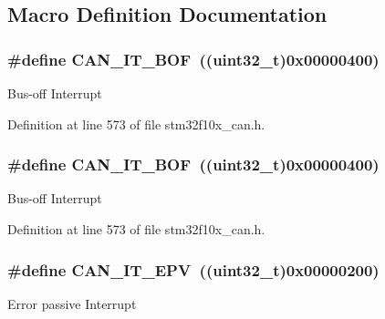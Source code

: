 \subsection{Macro Definition Documentation}
\subsubsection[{\texorpdfstring{C\+A\+N\+\_\+\+I\+T\+\_\+\+B\+OF}{CAN_IT_BOF}}]{\setlength{\rightskip}{0pt plus 5cm}\#define C\+A\+N\+\_\+\+I\+T\+\_\+\+B\+OF~(({\bf uint32\+\_\+t})0x00000400)}\hypertarget{group___c_a_n__interrupts_gad63c39e6237aa07681a1f8ce2ff9e167}{}\label{group___c_a_n__interrupts_gad63c39e6237aa07681a1f8ce2ff9e167}
Bus-\/off Interrupt 

Definition at line 573 of file stm32f10x\+\_\+can.\+h.

\subsubsection[{\texorpdfstring{C\+A\+N\+\_\+\+I\+T\+\_\+\+B\+OF}{CAN_IT_BOF}}]{\setlength{\rightskip}{0pt plus 5cm}\#define C\+A\+N\+\_\+\+I\+T\+\_\+\+B\+OF~(({\bf uint32\+\_\+t})0x00000400)}\hypertarget{group___c_a_n__interrupts_gad63c39e6237aa07681a1f8ce2ff9e167}{}\label{group___c_a_n__interrupts_gad63c39e6237aa07681a1f8ce2ff9e167}
Bus-\/off Interrupt 

Definition at line 573 of file stm32f10x\+\_\+can.\+h.

\subsubsection[{\texorpdfstring{C\+A\+N\+\_\+\+I\+T\+\_\+\+E\+PV}{CAN_IT_EPV}}]{\setlength{\rightskip}{0pt plus 5cm}\#define C\+A\+N\+\_\+\+I\+T\+\_\+\+E\+PV~(({\bf uint32\+\_\+t})0x00000200)}\hypertarget{group___c_a_n__interrupts_ga006b7b641d337a599ceac64b483e75dd}{}\label{group___c_a_n__interrupts_ga006b7b641d337a599ceac64b483e75dd}
Error passive Interrupt 

